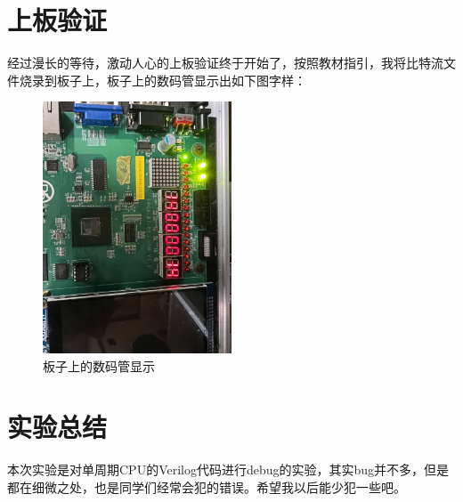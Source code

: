 \documentclass[UTF8]{article}
\begin{document}
\section{上板验证}

经过漫长的等待，激动人心的上板验证终于开始了，按照教材指引，我将比特流文件烧录到板子上，板子上的数码管显示出如下图字样：

\begin{figure}[H]
    \centering
    \includegraphics[width=0.5\textwidth]{board.png}
    \caption{板子上的数码管显示}
\end{figure}

\section{实验总结}

本次实验是对单周期CPU的Verilog代码进行debug的实验，其实bug并不多，但是都在细微之处，也是同学们经常会犯的错误。希望我以后能少犯一些吧。
\end{document}
